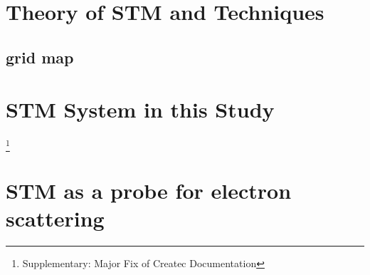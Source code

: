 \section{Theory of STM and Techniques}
\subsection{grid map}
\section{STM System in this Study}
\footnote{Supplementary: Major Fix of Createc Documentation}
\section{STM as a probe for electron scattering}
